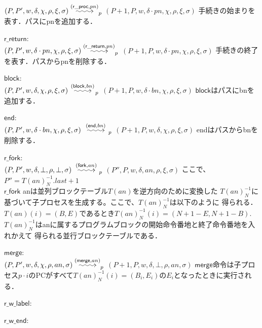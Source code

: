 \documentclass[submit,PRO]{ipsj}
\makeatletter
\newcommand{\longsquiggly}{\xymatrix{{}\ar@{~>}[r]&{}}}
\newcommand{\bcode}[1]{$\mathsf{#1}$}
\newcommand{\brightarrow}[1]{\stackrel{#1}{\longsquiggly}}
\makeatother
\begin{document}
\begin{list}
$(P,P',w,\delta,\chi,\rho,\xi,\sigma)\brightarrow{(\mathsf{r\_proc},pn)}_p$\newline
\qquad $(P+1,P,w,\delta\cdot pn,\chi,\rho,\xi,\sigma)$\newline
手続きの始まりを表す．パスにpnを追加する．
\item \bcode{r\_return}:\\
$(P,P',w,\delta\cdot pn,\chi,\rho,\xi,\sigma)\brightarrow{(\mathsf{r\_return},pn)}_p$\newline
\qquad $(P+1,P,w,\delta\cdot pn,\chi,\rho,\xi,\sigma)$\newline
手続きの終了を表す．パスからpnを削除する．
\item \bcode{block}:\\
$(P,P',w,\delta,\chi,\rho,\xi,\sigma)\brightarrow{(\mathsf{block},bn)}_p$\newline
\qquad $(P+1,P,w,\delta\cdot bn,\chi,\rho,\xi,\sigma)$\newline
\bcode{block}はパスにbnを追加する．
\item \bcode{end}:\\
$(P,P',w,\delta\cdot bn,\chi,\rho,\xi,\sigma)\brightarrow{(\mathsf{end},bn)}_p$\newline
\qquad $(P+1,P,w,\delta,\chi,\rho,\xi,\sigma)$\newline
endはパスからbnを削除する．
\item \bcode{r\_fork}:\\
$(P,P',w,\delta,\bot,\rho,\bot,\sigma)\brightarrow{(\mathsf{fork},an)}_p$\newline
\qquad $(P'',P,w,\delta,an,\rho,\xi,\sigma)$\newline
ここで、$P''=T(an)^{-1}_N.last+1$\\
\bcode{r\_fork} anは並列ブロックテーブル$T(an)$を逆方向のために変換した
$T(an)^{-1}_N$に基づいて子プロセスを生成する。ここで、$T(an)^{-1}_N$は以下のように
得られる．
$T(an)(i)=(B,E)$であるとき$T(an)^{-1}_N(i)=(N+1-E,N+1-B)$.
$T(an)^{-1}_N$はanに属するプログラムブロックの開始命令番地と終了命令番地を入れかえて
得られる並行ブロックテーブルである．
\item \bcode{merge}:\\
$(P,P',w,\delta,\chi,\rho,an,\sigma)\brightarrow{(\mathsf{merge},an)}_p$\newline
\qquad $(P+1,P,w,\delta,\bot,\rho,an,\sigma)$\newline
\bcode{merge}命令は子プロセス$p\cdot i$のPCがすべて$T(an)^{-1}_N(i)=(B_i,E_i)$の$E_i$となったときに実行される．
\item \bcode{r\_w\_label}:
\item \bcode{r\_w\_end}:
\end{list}
\end{document}
